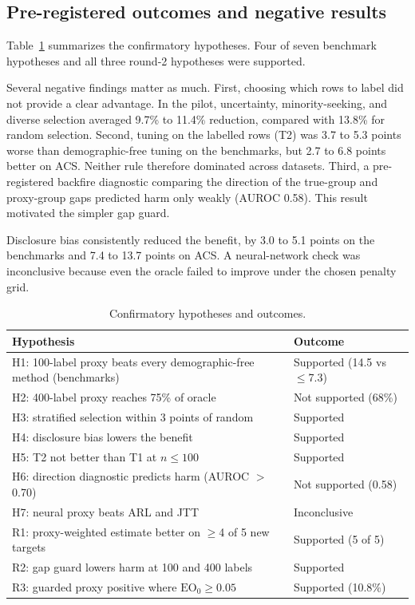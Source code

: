 \documentclass[conference]{IEEEtran}
\newcommand{\EO}{\mathrm{EO}}
\begin{document}
\subsection{Pre-registered outcomes and negative results}
Table~\ref{tab:hyp} summarizes the confirmatory hypotheses. Four of seven benchmark hypotheses and all three round-2 hypotheses were supported.

Several negative findings matter as much. First, choosing which rows to label did not provide a clear advantage. In the pilot, uncertainty, minority-seeking, and diverse selection averaged 9.7\% to 11.4\% reduction, compared with 13.8\% for random selection. Second, tuning on the labelled rows (T2) was 3.7 to 5.3 points worse than demographic-free tuning on the benchmarks, but 2.7 to 6.8 points better on ACS. Neither rule therefore dominated across datasets. Third, a pre-registered backfire diagnostic comparing the direction of the true-group and proxy-group gaps predicted harm only weakly (AUROC 0.58). This result motivated the simpler gap guard.

Disclosure bias consistently reduced the benefit, by 3.0 to 5.1 points on the benchmarks and 7.4 to 13.7 points on ACS. A neural-network check was inconclusive because even the oracle failed to improve under the chosen penalty grid.

\begin{table}[t]
\caption{Confirmatory hypotheses and outcomes.}
\label{tab:hyp}
\centering
\footnotesize
\setlength{\tabcolsep}{3pt}
\begin{tabular}{@{}>{\raggedright\arraybackslash}p{5.45cm}>{\raggedright\arraybackslash}p{2.8cm}@{}}
\toprule
Hypothesis & Outcome \\
\midrule
H1: 100-label proxy beats every demographic-free method (benchmarks) & Supported (14.5 vs $\le$7.3) \\
H2: 400-label proxy reaches 75\% of oracle & Not supported (68\%) \\
H3: stratified selection within 3 points of random & Supported \\
H4: disclosure bias lowers the benefit & Supported \\
H5: T2 not better than T1 at $n\le100$ & Supported \\
H6: direction diagnostic predicts harm (AUROC $>$0.70) & Not supported (0.58) \\
H7: neural proxy beats ARL and JTT & Inconclusive \\
\midrule
R1: proxy-weighted estimate better on $\ge$4 of 5 new targets & Supported (5 of 5) \\
R2: gap guard lowers harm at 100 and 400 labels & Supported \\
R3: guarded proxy positive where $\EO_0\ge0.05$ & Supported (10.8\%) \\
\bottomrule
\end{tabular}
\end{table}
\end{document}
